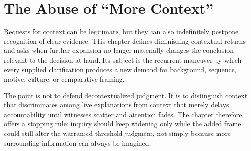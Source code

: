 
\chapter{The Abuse of ``More Context''}
\label{ch:ch095}

Requests for context can be legitimate, but they can also indefinitely postpone recognition of clear evidence. This chapter defines diminishing contextual returns and asks when further expansion no longer materially changes the conclusion relevant to the decision at hand. Its subject is the recurrent maneuver by which every supplied clarification produces a new demand for background, sequence, motive, culture, or comparative framing.

The point is not to defend decontextualized judgment. It is to distinguish context that discriminates among live explanations from context that merely delays accountability until witnesses scatter and attention fades. The chapter therefore offers a stopping rule: inquiry should keep widening only while the added frame could still alter the warranted threshold judgment, not simply because more surrounding information can always be imagined.
